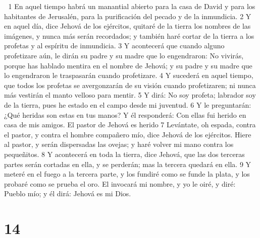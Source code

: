 
1 En aquel tiempo habrá un manantial abierto para la casa de David y para los habitantes de Jerusalén, para la purificación del pecado y de la inmundicia.
2 Y en aquel día, dice Jehová de los ejércitos, quitaré de la tierra los nombres de las imágenes, y nunca más serán recordados; y también haré cortar de la tierra a los profetas y al espíritu de inmundicia.
3 Y acontecerá que cuando alguno profetizare aún, le dirán su padre y su madre que lo engendraron: No vivirás, porque has hablado mentira en el nombre de Jehová; y su padre y su madre que lo engendraron le traspasarán cuando profetizare.
4 Y sucederá en aquel tiempo, que todos los profetas se avergonzarán de su visión cuando profetizaren; ni nunca más vestirán el manto velloso para mentir.
5 Y dirá: No soy profeta; labrador soy de la tierra, pues he estado en el campo desde mi juventud.
6 Y le preguntarán: ¿Qué heridas son estas en tus manos? Y él responderá: Con ellas fui herido en casa de mis amigos.
El pastor de Jehová es herido
7 Levántate, oh espada, contra el pastor, y contra el hombre compañero mío, dice Jehová de los ejércitos. Hiere al pastor, y serán dispersadas las ovejas; y haré volver mi mano contra los pequeñitos.
8 Y acontecerá en toda la tierra, dice Jehová, que las dos terceras partes serán cortadas en ella, y se perderán; mas la tercera quedará en ella.
9 Y meteré en el fuego a la tercera parte, y los fundiré como se funde la plata, y los probaré como se prueba el oro. El invocará mi nombre, y yo le oiré, y diré: Pueblo mío; y él dirá: Jehová es mi Dios.

\chapter{14}

